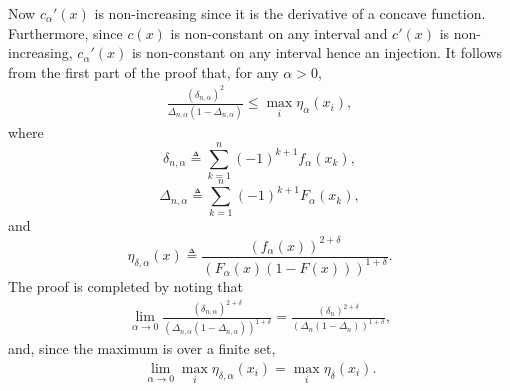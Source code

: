Now $c_\alpha'(x)$ is non-increasing since it is the derivative of a concave function. Furthermore, since $c(x)$ is non-constant on any interval and $c'(x)$ is non-increasing, $c_\alpha'(x)$ is non-constant on any interval hence an injection. It follows from the first part of the proof that, for any $\alpha>0$,
\begin{align}
\label{eq:proof:lem:bound_intervals}
\frac{(\delta_{n,\alpha})^2}{\Delta_{n,\alpha}(1-\Delta_{n,\alpha})} \leq \max_i \eta_{\alpha}(x_i),
\end{align}
where 
\[
\delta_{n,\alpha} \triangleq  \sum_{k=1}^{n} (-1)^{k+1} f_{\alpha}(x_k),
\]
\[
\Delta_{n,\alpha} \triangleq \sum_{k=1}^n (-1)^{k+1} F_{\alpha}(x_k), 
\]
and 
\[
\eta_{\delta,\alpha}(x) \triangleq \frac{(f_\alpha(x))^{2+\delta}}{\left(F_{\alpha}(x)(1-F(x)) \right)^{1+\delta}}. 
\]
The proof is completed by noting that 
\begin{align*}
\lim_{\alpha \to 0} \frac{(\delta_{n,\alpha})^{2+\delta} }{ \left(\Delta_{n,\alpha}(1-\Delta_{n,\alpha})\right)^{1+\delta}}  = \frac{(\delta_{n})^{2+\delta }}{\left(\Delta_{n}(1-\Delta_{n}) \right)^{1+\delta}},  
\end{align*}
and, since the maximum is over a finite set,
\begin{align*}
\lim_{\alpha \to 0}  \max_i \eta_{\delta,\alpha}(x_i)  = \max_i\eta_\delta(x_i).
\end{align*}




\QEDA 


